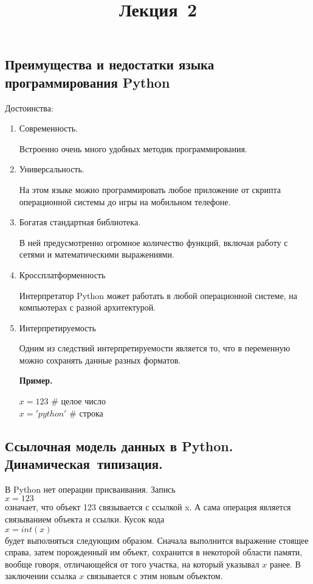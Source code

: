 \documentclass[a4paper, fleqn]{article}
\title{Лекция \textnumero\,2}
\author{}
\date{}
\newenvironment{example}[1][]{\medskip \noindent \textbf{Пример. #1}\par \nopagebreak}{\medskip \par} %
\begin{document}
	\maketitle
	\subsection*{Преимущества и недостатки языка программирования Python}
		Достоинства:
		\begin{enumerate}
			\item Современность.
			
			Встроенно очень много удобных методик программирования.
			
			\item Универсальность.
			
			На этом языке можно программировать любое приложение от скрипта операционной системы до игры на мобильном телефоне.
			
			\item Богатая стандартная библиотека.
			
			В ней предусмотренно огромное количество функций, включая работу с сетями и математическими выражениями.
			
			\item Кроссплатформенность
			
			Интерпретатор Python может работать в любой операционной системе, на компьютерах с разной архитектурой.
			
			\item Интерпретируемость
			
			Одним из следствий интерпретируемости является то, что в переменную можно сохранять данные разных форматов. 
			
			\begin{example}
				$x = 123$  \# целое число \\
				$x = 'python'$  \# строка	
			\end{example}
		\end{enumerate}
		
	\subsection* {Ссылочная модель данных в Python. Динамическая~типизация.}
	
		В Python нет операции присваивания. Запись\\
		$x = 123$ \\
		означает, что объект 123 связывается с ссылкой x. А сама операция является связыванием объекта и ссылки.
		Кусок кода \\
		$x = int(x)$ \\
		будет выполняться следующим образом. Сначала выполнится выражение стоящее справа, затем порожденный им объект, сохранится в некоторой области памяти, вообще говоря, отличающейся от того участка, на который указывал $x$ ранее. В заключении ссылка $x$ связывается с этим новым объектом.
		
\end{document}
